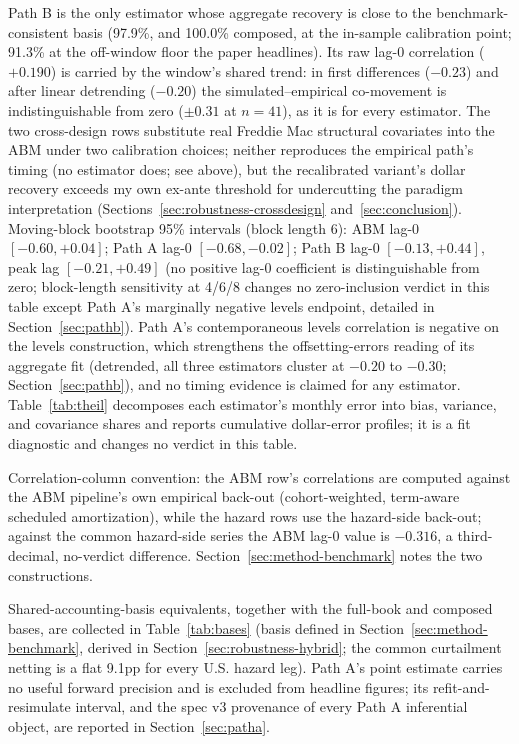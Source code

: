 \documentclass[12pt]{article}
\begin{document}
\begin{table}[H]
\begin{threeparttable}
\begin{tablenotes}[flushleft]
\item Path B is the only estimator whose aggregate recovery is close to the benchmark-consistent basis (97.9\%, and 100.0\% composed, at the in-sample calibration point; 91.3\% at the off-window floor the paper headlines). Its raw lag-0 correlation ($+0.190$) is carried by the window's shared trend: in first differences ($-0.23$) and after linear detrending ($-0.20$) the simulated--empirical co-movement is indistinguishable from zero ($\pm 0.31$ at $n = 41$), as it is for every estimator. The two cross-design rows substitute real Freddie Mac structural covariates into the ABM under two calibration choices; neither reproduces the empirical path's timing (no estimator does; see above), but the recalibrated variant's dollar recovery exceeds my own ex-ante threshold for undercutting the paradigm interpretation (Sections~\ref{sec:robustness-crossdesign} and~\ref{sec:conclusion}). Moving-block bootstrap 95\% intervals (block length 6): ABM lag-0 $[-0.60, +0.04]$; Path A lag-0 $[-0.68, -0.02]$; Path B lag-0 $[-0.13, +0.44]$, peak lag $[-0.21, +0.49]$ (no positive lag-0 coefficient is distinguishable from zero; block-length sensitivity at 4/6/8 changes no zero-inclusion verdict in this table except Path A's marginally negative levels endpoint, detailed in Section~\ref{sec:pathb}). Path A's contemporaneous levels correlation is negative on the levels construction, which strengthens the offsetting-errors reading of its aggregate fit (detrended, all three estimators cluster at $-0.20$ to $-0.30$; Section~\ref{sec:pathb}), and no timing evidence is claimed for any estimator. Table~\ref{tab:theil} decomposes each estimator's monthly error into bias, variance, and covariance shares and reports cumulative dollar-error profiles; it is a fit diagnostic and changes no verdict in this table.
\item Correlation-column convention: the ABM row's correlations are computed against the ABM pipeline's own empirical back-out (cohort-weighted, term-aware scheduled amortization), while the hazard rows use the hazard-side back-out; against the common hazard-side series the ABM lag-0 value is $-0.316$, a third-decimal, no-verdict difference. Section~\ref{sec:method-benchmark} notes the two constructions.
\item Shared-accounting-basis equivalents, together with the full-book and composed bases, are collected in Table~\ref{tab:bases} (basis defined in Section~\ref{sec:method-benchmark}, derived in Section~\ref{sec:robustness-hybrid}; the common curtailment netting is a flat 9.1pp for every U.S. hazard leg). Path A's point estimate carries no useful forward precision and is excluded from headline figures; its refit-and-resimulate interval, and the spec v3 provenance of every Path A inferential object, are reported in Section~\ref{sec:patha}.
\end{tablenotes}
\end{threeparttable}
\end{table}
\end{document}
